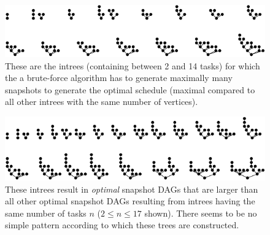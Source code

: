 \begin{figure}[t]
  \centering
  \includegraphics[scale=1.4]{p3/max_unoptimized.pdf}
  \caption{These are the intrees (containing between 2 and 14 tasks) for which the a brute-force algorithm has to generate maximally many snapshots to generate the optimal schedule (maximal compared to all other intrees with the same number of vertices).}
  \label{fig:intrees-maximum-unoptimized-p3}
\end{figure}

\begin{figure}[t]
  \centering
  \includegraphics[scale=1.4]{p3/max_snapshot_dag.pdf}
  \caption{These intrees result in \emph{optimal} snapshot DAGs that are larger than all other optimal snapshot DAGs resulting from intrees having the same number of tasks $n$ ($2 \leq n \leq 17$ shown). There seems to be no simple pattern according to which these trees are constructed.}
  \label{fig:intrees-maximum-snapshot-dag-size-p3}
\end{figure}




